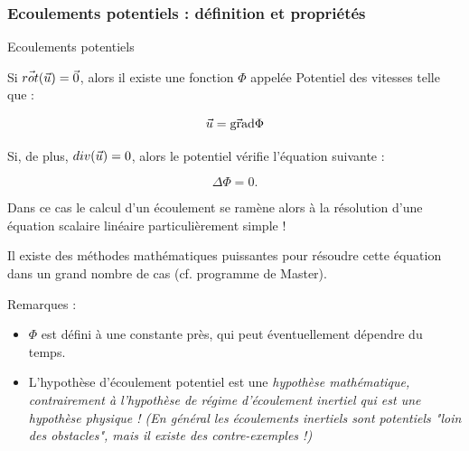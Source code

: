 %


\subsubsection{Ecoulements potentiels : définition et propriétés}
\begin{frame}{Ecoulements potentiels} \hypertarget{frame:toto}{}

\small



\vspace{0mm}

Si $\vec{rot}(\vec{u}) = \vec{0}$, alors il existe une fonction 
$\Phi$ appelée {\color{red}Potentiel des vitesses } telle que :

$$
\vec{u} = \vec{\mbox{\rm gra}}\mbox{\rm d}{\Phi}
$$


\pause
Si, de plus, $div(\vec{u}) = 0$, alors le potentiel vérifie l'équation suivante :

$$
\Delta{\Phi} = 0.
$$

Dans ce cas le calcul d'un écoulement se ramène alors à la résolution d'une équation scalaire linéaire particulièrement simple  !

\smallskip

Il existe des méthodes mathématiques puissantes pour résoudre cette équation dans un grand nombre de cas (cf. programme de Master).


\pause 
\medskip
Remarques :

\begin{itemize}
\item
 $\Phi$ est défini à une constante près, qui peut éventuellement dépendre du temps.

\pause 

\item L'hypothèse d'écoulement potentiel est une \em{hypothèse mathématique}, contrairement à l'hypothèse de régime d'écoulement inertiel qui est une hypothèse physique !
 \smallskip 
(En général les écoulements inertiels sont potentiels "loin des obstacles", mais il existe des contre-exemples !) 




\end{itemize}


\end{frame}




